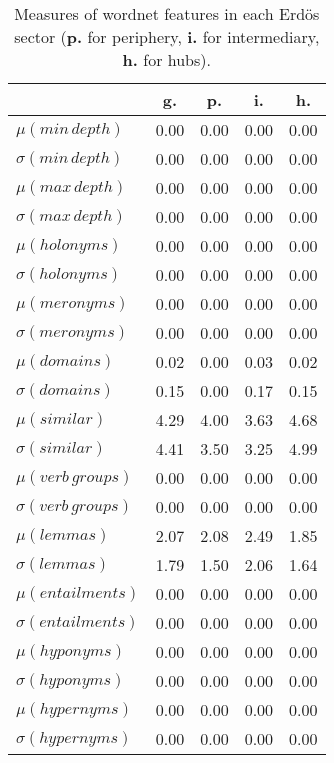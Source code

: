 \begin{table}[h!]
\begin{center}
\begin{tabular}{| l || c | c | c | c |}\hline
 & {\bf g.} & {\bf p.} & {\bf i.} & {\bf h.} \\\hline\hline
$\mu(min\,depth)$ & 0.00  & 0.00  & 0.00  & 0.00 \\
$\sigma(min\,depth)$ & 0.00  & 0.00  & 0.00  & 0.00 \\\hline
$\mu(max\,depth)$ & 0.00  & 0.00  & 0.00  & 0.00 \\
$\sigma(max\,depth)$ & 0.00  & 0.00  & 0.00  & 0.00 \\\hline
$\mu(holonyms)$ & 0.00  & 0.00  & 0.00  & 0.00 \\
$\sigma(holonyms)$ & 0.00  & 0.00  & 0.00  & 0.00 \\\hline
$\mu(meronyms)$ & 0.00  & 0.00  & 0.00  & 0.00 \\
$\sigma(meronyms)$ & 0.00  & 0.00  & 0.00  & 0.00 \\\hline
$\mu(domains)$ & 0.02  & 0.00  & 0.03  & 0.02 \\
$\sigma(domains)$ & 0.15  & 0.00  & 0.17  & 0.15 \\\hline
$\mu(similar)$ & 4.29  & 4.00  & 3.63  & 4.68 \\
$\sigma(similar)$ & 4.41  & 3.50  & 3.25  & 4.99 \\\hline
$\mu(verb\,groups)$ & 0.00  & 0.00  & 0.00  & 0.00 \\
$\sigma(verb\,groups)$ & 0.00  & 0.00  & 0.00  & 0.00 \\\hline
$\mu(lemmas)$ & 2.07  & 2.08  & 2.49  & 1.85 \\
$\sigma(lemmas)$ & 1.79  & 1.50  & 2.06  & 1.64 \\\hline
$\mu(entailments)$ & 0.00  & 0.00  & 0.00  & 0.00 \\
$\sigma(entailments)$ & 0.00  & 0.00  & 0.00  & 0.00 \\\hline
$\mu(hyponyms)$ & 0.00  & 0.00  & 0.00  & 0.00 \\
$\sigma(hyponyms)$ & 0.00  & 0.00  & 0.00  & 0.00 \\\hline
$\mu(hypernyms)$ & 0.00  & 0.00  & 0.00  & 0.00 \\
$\sigma(hypernyms)$ & 0.00  & 0.00  & 0.00  & 0.00 \\\hline
\end{tabular}
\caption{Measures of wordnet features in each Erd\"os sector ({{\bf p.}} for periphery, {{\bf i.}} for intermediary, {{\bf h.}} for hubs).}
\end{center}
\end{table}
